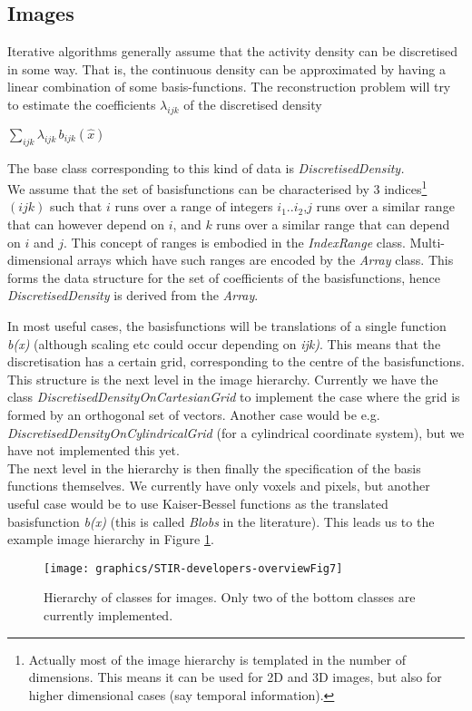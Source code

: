 \documentclass{article}
\begin{document}
\subsection{
Images}

Iterative algorithms generally assume that the activity density 
can be discretised in some way. That is, the continuous density 
can be approximated by having a linear combination of some basis-functions. 
The reconstruction problem will try to estimate the coefficients $\lambda_{ijk}$ of 
the discretised density


$\sum_{ ijk}\lambda _{ijk} \,b_{ijk} (\widehat{x})  $

The base class corresponding to this kind of data is \textit{DiscretisedDensity.}\\
We assume that the set of basisfunctions can be characterised 
by 3 indices\footnote{{\small Actually most of the image hierarchy is 
templated in the number of dimensions. This means it can be used 
for 2D and 3D images, but also for higher dimensional cases (say 
temporal information).}} $(ijk)$ such that $i$ runs over a 
range of integers $i_1..i_2$,$j$ runs over a 
similar range that can however depend on $i$, and $k$ runs 
over a similar range that can depend on $i$ and $j$. 
This 
concept of ranges is embodied in the \textit{IndexRange} class. Multi-dimensional 
arrays which have such ranges are encoded by the \textit{Array} class. 
This forms the data structure for the set of coefficients of 
the basisfunctions, hence \textit{DiscretisedDensity} is derived from 
the \textit{Array}.


In most useful cases, the basisfunctions will be translations 
of a single function \textit{b(x)} (although scaling etc could occur 
depending on \textit{ijk)}. This means that the discretisation has 
a certain grid, corresponding to the centre of the basisfunctions. 
This structure is the next level in the image hierarchy. Currently 
we have the class \textit{DiscretisedDensityOnCartesianGrid} to implement 
the case where the grid is formed by an orthogonal set of vectors. 
Another case would be e.g. \textit{DiscretisedDensityOnCylindricalGrid} 
(for a cylindrical coordinate system), but we have not implemented 
this yet.\\
The next level in the hierarchy is then finally the specification 
of the basis functions themselves. We currently have only voxels 
and pixels, but another useful case would be to use Kaiser-Bessel 
functions as the translated basisfunction \textit{b(x)} (this is called \textit{Blobs} 
in the literature). This leads us to the example image hierarchy 
in Figure \ref{image-hierarchy}.\\
\begin{figure}[htbp]
\begin{center}
\texttt{[image: graphics/STIR-developers-overviewFig7]}
\caption{ Hierarchy of classes for images. Only two 
of the bottom classes are currently implemented.}
\label{image-hierarchy}
\end{center}
\end{figure}
\end{document}
